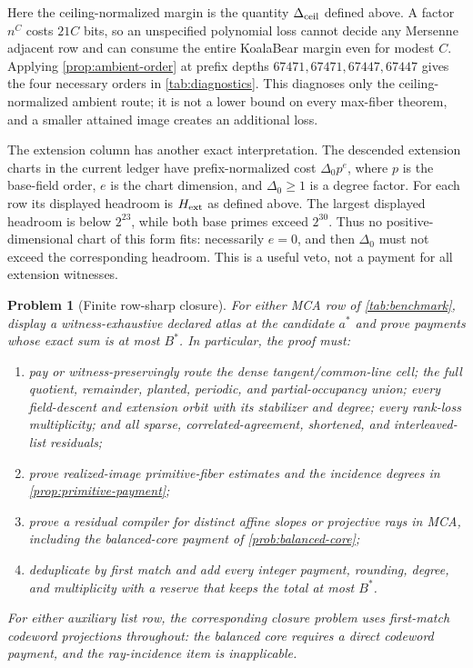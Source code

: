 \documentclass[a4paper,11pt]{amsart}
\newtheorem{problem}[theorem]{Problem}
\theoremstyle{remark}
\begin{document}
Here the ceiling-normalized margin is the quantity \(\Delta_{\rm ceil}\)
defined above.  A factor \(n^C\) costs
\(21C\) bits, so an unspecified polynomial loss cannot decide any Mersenne
adjacent row and can consume the entire KoalaBear margin even for modest
\(C\).  Applying \cref{prop:ambient-order} at prefix depths
\(67471,67471,67447,67447\) gives the four necessary orders in
\cref{tab:diagnostics}.  This diagnoses only the ceiling-normalized ambient
route; it is not a lower bound on every max-fiber theorem, and a smaller
attained image creates an additional loss.

The extension column has another exact interpretation.  The descended
extension charts in the current ledger have prefix-normalized cost
\(\Delta_0p^e\), where \(p\) is the base-field order, \(e\) is the chart
dimension, and \(\Delta_0\ge1\) is a degree factor.  For each row its
displayed headroom is \(H_{\rm ext}\) as defined above.  The largest displayed
headroom is below \(2^{23}\), while both base primes exceed \(2^{30}\).
Thus no positive-dimensional chart of this form fits: necessarily \(e=0\),
and then \(\Delta_0\) must not exceed the corresponding headroom.  This is a
useful veto, not a payment for all extension witnesses.

\begin{problem}[Finite row-sharp closure]\label{prob:finite-closure}
For either MCA row of \cref{tab:benchmark}, display a witness-exhaustive
declared atlas at the candidate \(a^*\) and prove payments whose exact sum is
at most \(B^*\).  In particular, the proof must:
\begin{enumerate}[label=\textup{(\alph*)}]
\item pay or witness-preservingly route the dense tangent/common-line cell;
the full quotient, remainder, planted, periodic, and partial-occupancy union;
every field-descent and extension orbit with its stabilizer and degree; every
rank-loss multiplicity; and all sparse, correlated-agreement, shortened, and
interleaved-list residuals;
\item prove realized-image primitive-fiber estimates and the incidence
degrees in \cref{prop:primitive-payment};
\item prove a residual compiler for distinct affine slopes or projective rays
in MCA, including the balanced-core payment of \cref{prob:balanced-core};
\item deduplicate by first match and add every integer payment, rounding,
degree, and multiplicity with a reserve that keeps the total at most \(B^*\).
\end{enumerate}
For either auxiliary list row, the corresponding closure problem uses
first-match codeword projections throughout: the balanced core requires a
direct codeword payment, and the ray-incidence item is inapplicable.
\end{problem}
\end{document}
